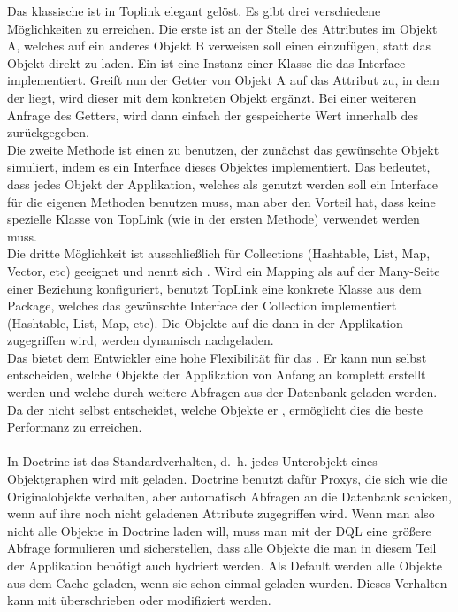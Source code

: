 Das klassische  ist in Toplink elegant gelöst. Es gibt drei verschiedene Möglichkeiten  zu erreichen. Die erste ist an der Stelle des Attributes im Objekt A, welches auf ein anderes Objekt B verweisen soll einen  einzufügen, statt das Objekt direkt zu laden. Ein  ist eine Instanz einer Klasse die das Interface  implementiert. Greift nun der Getter von Objekt A auf das Attribut zu, in dem der  liegt, wird dieser mit dem konkreten Objekt ergänzt. Bei einer weiteren Anfrage des Getters, wird dann einfach der gespeicherte Wert innerhalb des  zurückgegeben. \\
Die zweite Methode ist einen  zu benutzen, der zunächst das gewünschte Objekt simuliert, indem es ein Interface dieses Objektes implementiert. Das bedeutet, dass jedes Objekt der Applikation, welches als  genutzt werden soll ein Interface für die eigenen Methoden benutzen muss, man aber den Vorteil hat, dass keine spezielle Klasse von TopLink (wie in der ersten Methode) verwendet werden muss.\\
Die dritte Möglichkeit ist ausschließlich für Collections (Hashtable, List, Map, Vector, etc) geeignet und nennt sich . Wird ein Mapping als  auf der Many-Seite einer Beziehung konfiguriert, benutzt TopLink eine konkrete Klasse aus dem  Package, welches das gewünschte Interface der Collection implementiert (Hashtable, List, Map, etc). Die Objekte auf die dann in der Applikation zugegriffen wird, werden dynamisch nachgeladen. \\
Das bietet dem Entwickler eine hohe Flexibilität für das . Er kann nun selbst entscheiden, welche Objekte der Applikation von Anfang an komplett erstellt werden und welche durch weitere Abfragen aus der Datenbank geladen werden. Da der  nicht selbst entscheidet, welche Objekte er , ermöglicht dies die beste Performanz zu erreichen. \\
\\
In Doctrine ist  das Standardverhalten, d.~h. jedes Unterobjekt eines Objektgraphen wird mit  geladen. Doctrine benutzt dafür Proxys, die sich wie die Originalobjekte verhalten, aber automatisch Abfragen an die Datenbank schicken, wenn auf ihre noch nicht geladenen Attribute zugegriffen wird. Wenn man also nicht alle Objekte in Doctrine laden will, muss man mit der DQL eine größere Abfrage formulieren und sicherstellen, dass alle Objekte die man in diesem Teil der Applikation benötigt auch hydriert werden. Als Default werden alle Objekte aus dem Cache geladen, wenn sie schon einmal geladen wurden. Dieses Verhalten kann mit  überschrieben oder modifiziert werden.\\
